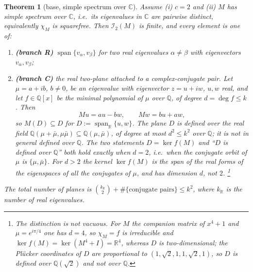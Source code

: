 \documentclass[journal]{IEEEtran}
\theoremstyle{plainn}
\newtheorem{thm}{Theorem}
\theoremstyle{remark}
\begin{document}
\begin{thm}[base, simple spectrum over $\mathbb C$]\label{thm:base}
Assume (i) $c=2$ and (ii) $M$ has simple spectrum over $\mathbb C$, i.e.\ its eigenvalues in
$\mathbb C$ are pairwise distinct, equivalently $\chi_M$ is squarefree. Then $\mathcal I_2(M)$ is finite,
and every element is one of:
\begin{enumerate}[label=\arabic*.,leftmargin=*,itemsep=1pt,topsep=2pt]
\item \textbf{(branch R)} $\operatorname{span}\{v_\alpha,v_\beta\}$ for two real eigenvalues
$\alpha\ne\beta$ with eigenvectors $v_\alpha,v_\beta$;
\item \textbf{(branch C)} the real two-plane attached to a complex-conjugate pair. Let
$\mu=a+ib$, $b\ne0$, be an eigenvalue with eigenvector $z=u+iw$, $u,w$ real, and let $f\in\mathbb Q[x]$
be the minimal polynomial of $\mu$ over $\mathbb Q$, of degree $d=\deg f\le k$. Then
\[
Mu=au-bw,\qquad Mw=bu+aw,
\]
so $M(D)\subseteq D$ for $D:=\operatorname{span}_{\mathbb R}\{u,w\}$. The plane $D$ is defined over the
real field $\mathbb Q(\mu+\bar\mu,\mu\bar\mu)\subseteq\mathbb Q(\mu,\bar\mu)$, of degree at most
$d^2\le k^2$ over $\mathbb Q$; it is \emph{not} in general defined over $\mathbb Q$. The two statements
$D=\ker f(M)$ and ``$D$ is defined over $\mathbb Q$'' both hold exactly when $d=2$, i.e.\ when the
conjugate orbit of $\mu$ is $\{\mu,\bar\mu\}$. For $d>2$ the kernel $\ker f(M)$ is the span of the real
forms of the eigenspaces of all the conjugates of $\mu$, and has dimension $d$, not $2$.%
\footnote{The distinction is not vacuous. For $M$ the companion matrix of $x^4+1$ and
$\mu=e^{i\pi/4}$ one has $d=4$, so $\chi_M=f$ is irreducible and
$\ker f(M)=\ker(M^4+I)=\mathbb R^4$, whereas $D$ is two-dimensional; the Pl\"ucker coordinates of $D$
are proportional to $(1,\sqrt2,1,1,\sqrt2,1)$, so $D$ is defined over $\mathbb Q(\sqrt2)$ and not over
$\mathbb Q$.}
\end{enumerate}
The total number of planes is $\binom{k_{\mathbb R}}{2}+\#\{\text{conjugate pairs}\}\le k^2$, where
$k_{\mathbb R}$ is the number of real eigenvalues.
\end{thm}
\end{document}
